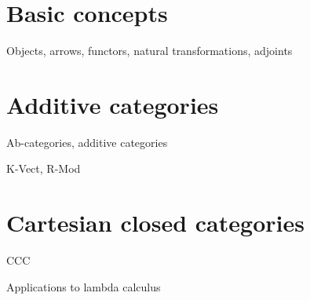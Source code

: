 \section{Basic concepts}
Objects, arrows, functors, natural transformations, adjoints

\section{Additive categories}
Ab-categories, additive categories

K-Vect, R-Mod

\section{Cartesian closed categories}
CCC

Applications to lambda calculus




